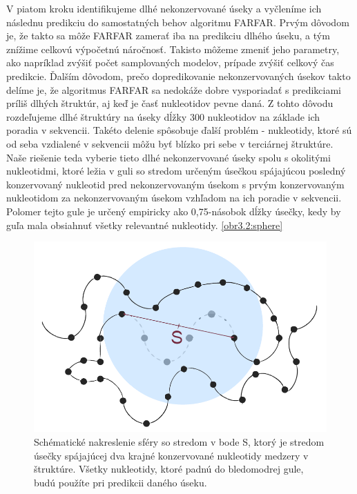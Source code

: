 \indent V piatom kroku identifikujeme dlhé nekonzervované úseky a vyčleníme ich následnu predikciu do samostatných behov algoritmu FARFAR. 
Prvým dôvodom je, že takto sa môže FARFAR zamerať iba na predikciu dlhého úseku, a tým znížime celkovú výpočetnú náročnosť. Takisto môžeme zmeniť jeho parametry, ako napríklad zvýšiť počet samplovaných modelov, prípade zvýšiť celkový čas predikcie. 
Ďalším dôvodom, prečo dopredikovanie nekonzervovaných úsekov takto delíme je, že algoritmus FARFAR sa nedokáže dobre vysporiadať s predikciami príliš dlhých štruktúr, aj keď je časť nukleotidov pevne daná. Z tohto dôvodu rozdeľujeme dlhé štruktúry na úseky dĺžky 300 nukleotidov na základe ich poradia v sekvencii. Takéto delenie spôsobuje ďalší problém - nukleotidy, ktoré sú od seba vzdialené v sekvencii môžu byť blízko pri sebe v terciárnej štruktúre. 
Naše riešenie teda vyberie tieto dlhé nekonzervované úseky spolu s okolitými nukleotidmi, ktoré ležia v guli so stredom určeným úsečkou spájajúcou posledný konzervovaný nukleotid pred nekonzervovaným úsekom s prvým konzervovaným nukleotidom za nekonzervovaným úsekom vzhľadom na ich poradie v sekvencii. Polomer tejto gule je určený empiricky ako 0,75-násobok dĺžky úsečky, kedy by guľa mala obsiahnuť všetky relevantné nukleotidy. \autoref{obr3.2:sphere}

\begin{figure}%
\includegraphics[width=\textwidth]{../img/sphere}
\caption{Schématické nakreslenie sféry so stredom v bode S, ktorý je stredom úsečky spájajúcej dva krajné konzervované nukleotidy medzery v štruktúre. Všetky nukleotidy, ktoré padnú do bledomodrej gule, budú použíte pri predikcii daného úseku.}
\label{obr3.2:sphere}
\end{figure}

